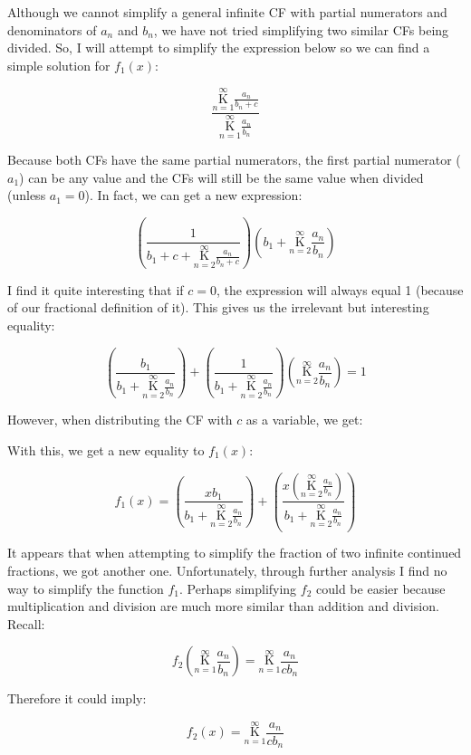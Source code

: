 \documentclass{article}
\begin{document}
Although we cannot simplify a general infinite CF with partial numerators and denominators of $a_n$ and $b_n$, we have not tried simplifying two similar CFs being divided. So, I will attempt to simplify the expression below so we can find a simple solution for $f_1(x)$:

$$\frac{ \underset{n=1}{\overset{\infty}{\mathrm K}} \frac{a_n}{b_n+c}}{\underset{n=1}{\overset{\infty}{\mathrm K}} \frac{a_n}{b_n}}$$

Because both CFs have the same partial numerators, the first partial numerator ($a_1$) can be any value and the CFs will still be the same value when divided (unless $a_1=0$). In fact, we can get a new expression:

$$(\frac{1}{b_1+c+\underset{n=2}{\overset{\infty}{\mathrm K}} \frac{a_n}{b_n+c}})(b_1+\underset{n=2}{\overset{\infty}{\mathrm K}} \frac{a_n}{b_n})$$

I find it quite interesting that if $c=0$, the expression will always equal 1 (because of our fractional definition of it). This gives us the irrelevant but interesting equality:

$$(\frac{b_1}{b_1+\underset{n=2}{\overset{\infty}{\mathrm K}} \frac{a_n}{b_n}}) +(\frac{1}{b_1+\underset{n=2}{\overset{\infty}{\mathrm K}} \frac{a_n}{b_n}})(\underset{n=2}{\overset{\infty}{\mathrm K}} \frac{a_n}{b_n})=1$$

However, when distributing the CF with $c$ as a variable, we get:

With this, we get a new equality to $f_1(x)$:

$$f_1(x)=(\frac{xb_1}{b_1+\underset{n=2}{\overset{\infty}{\mathrm K}} \frac{a_n}{b_n}}) +(\frac{x(\underset{n=2}{\overset{\infty}{\mathrm K}} \frac{a_n}{b_n})}{b_1+\underset{n=2}{\overset{\infty}{\mathrm K}} \frac{a_n}{b_n}})$$

It appears that when attempting to simplify the fraction of two infinite continued fractions, we got another one. Unfortunately, through further analysis I find no way to simplify the function $f_1$. Perhaps simplifying $f_2$ could be easier because multiplication and division are much more similar than addition and division. Recall:

$$f_2(\underset{n=1}{\overset{\infty}{\mathrm K}} \frac{a_n}{b_n})=\underset{n=1}{\overset{\infty}{\mathrm K}} \frac{a_n}{cb_n}$$

Therefore it could imply:

$$f_2(x)=\underset{n=1}{\overset{\infty}{\mathrm K}} \frac{a_n}{cb_n}$$
\end{document}
